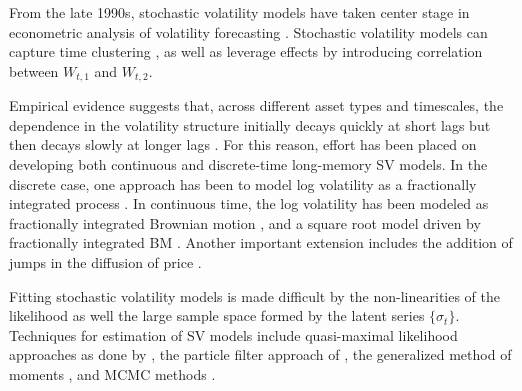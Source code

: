 

From the late 1990s, stochastic volatility models have taken center stage in econometric analysis of volatility forecasting \citep*{shephard2005selected-readings}. Stochastic volatility models can capture time clustering \citep*{hull1987pricing}, as well as leverage effects \citep*{yu2005leverage} by introducing correlation between $W_{t,1}$ and $W_{t,2}$. 

Empirical evidence suggests that, across different asset types and timescales, the dependence in the volatility structure initially decays quickly at short lags but then decays slowly at longer lags \citep*{andersen1997heterogeneous, andersen1997intraday, andersen1998answering}. For this reason, effort has been placed on developing both continuous and discrete-time long-memory SV models. In the discrete case, one approach has been to model log volatility as a fractionally integrated process \citep*{harvey2002long, breidt1998detection-estimation}. In continuous time, the log volatility has been modeled as fractionally integrated Brownian motion \citep*{comte1998long}, and a square root model driven by fractionally integrated BM \citep*{comte2012affine}. Another important extension includes the addition of jumps in the diffusion of price \citep*{bates1996jumps}. 

Fitting stochastic volatility models is made difficult by the non-linearities of the likelihood as well the large sample space formed by the latent series $\{ \sigma_t \}$. Techniques for estimation of SV models include quasi-maximal likelihood approaches as done by \cite{ruiz1994quasi}, the particle filter approach of \cite{sandmann1998estimation}, the generalized method of moments \citep*{melino1990pricing}, and MCMC methods \citep*{jacquier2002bayesian, kim1998stochastic, omori2007stochastic}.

